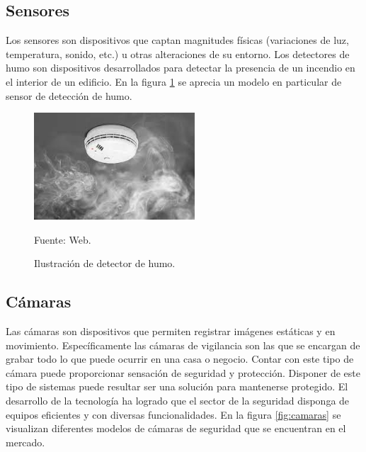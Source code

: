 \subsection{Sensores}
Los sensores son dispositivos que captan magnitudes físicas (variaciones de luz, temperatura, sonido, etc.) u otras alteraciones de su entorno. Los detectores de humo son dispositivos desarrollados para detectar la presencia de un incendio en el interior de un edificio. En la figura \ref{fig:detector_humo} se aprecia un modelo en particular de sensor de detección de humo.
\begin{figure}[H]
    \begin{center}
        \includegraphics[width=6cm]{img/capitulo_3/sensor_de_humo.jpg}
        \caption{Ilustración de detector de humo.}
        Fuente: Web.
        \label{fig:detector_humo}
    \end{center}
\end{figure}

\subsection{Cámaras}
Las cámaras son dispositivos que permiten registrar imágenes estáticas y en movimiento. Específicamente las cámaras de vigilancia son las que se encargan de grabar todo lo que puede ocurrir en una casa o negocio. Contar con este tipo de cámara puede proporcionar sensación de seguridad y protección. Disponer de este tipo de sistemas puede resultar ser una solución para mantenerse protegido. El desarrollo de la tecnología ha logrado que el sector de la seguridad disponga de equipos eficientes y con diversas funcionalidades. En la figura \ref{fig:camaras} se visualizan diferentes modelos de cámaras de seguridad que se encuentran en el mercado.\\


